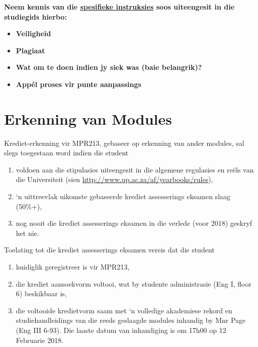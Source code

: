     \noindent
    \textbf{Neem kennis van die \uline{spesifieke instruksies} soos uiteengesit
    in die studiegids hierbo:}
    \begin{itemize}
        \item \textbf{Veiligheid}
        \item \textbf{Plagiaat}
        \item \textbf{Wat om te doen indien jy siek was (baie belangrik)?}
        \item \textbf{App\'el proses vir punte aanpassings}
    \end{itemize}

\newpage
\section{Erkenning van Modules} \label{sec:credit_study_guide}
    \noindent
    Krediet-erkenning vir MPR213, gebaseer op erkenning van ander modules,
    sal slegs toegestaan word indien die student
    \begin{enumerate}
        \item voldoen aan die stipulasies uiteengesit in die algemene
            regulasies en re\"els van die Universiteit (sien
            \url{http://www.up.ac.za/af/yearbooks/rules}),
        \item `n uittreevlak uikomste gebaseerde krediet assesserings eksamen
            slaag (50\%+),
        \item nog nooit die krediet assesserings eksamen in die verlede (voor
            2018) geskryf het nie.
    \end{enumerate}

    \noindent
    Toelating tot die krediet assesserings eksamen vereis dat die student
    \begin{enumerate}
        \item huidiglik geregistreer is vir MPR213,
        \item die krediet aansoekvorm voltooi, wat by studente administrasie
            (Eng I, floor 6) beskikbaar is,
        \item die voltooide kredietvorm saam met `n volledige akademiese rekord
            en studiehandleidings van die reeds geslaagde modules inhandig by
            Mnr Page (Eng III 6-93). Die laaste datum van inhandiging is om
            17h00 op 12 Februarie 2018.
    \end{enumerate}

